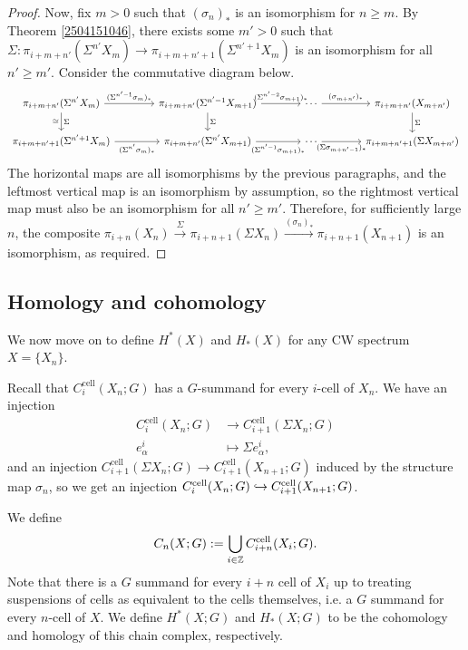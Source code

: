 \documentclass[11pt, titlepage]{article} %
\def\inj{\ensuremath\hookrightarrow}
\def\inte{\ensuremath\mathbb{Z}}
\numberwithin{equation}{subsection}
\theoremstyle{plain}
\theoremstyle{definition}
\begin{document}
\begin{proof}
Now, fix \(m >0\) such that \((\sigma_n)_*\) is an isomorphism for \(n\geq m\). By Theorem \ref{2504151046}, there exists some \(m'> 0\) such that \(\Sigma : \pi_{i+m+n'}(\Sigma^{n'}X_m)\to \pi_{i+m+n'+1}(\Sigma^{n'+1}X_m)\) is an isomorphism for all \(n'\geq m'\). Consider the  commutative diagram below. %
\[\begin{tikzcd}[column sep=9ex]
 \pi_{i+m+n'}(\Sigma^{n'}X_m) \arrow[r, "(\Sigma^{n'-1}\sigma_m)_*"] \arrow{d}{\Sigma}[swap]{\cong}  & \pi_{i+m+n'}(\Sigma^{n'-1}X_{m+1}) \arrow[r, "(\Sigma^{n'-2}\sigma_{m+1})_*"] \arrow[d, "\Sigma"] & \cdots \arrow[r, "(\sigma_{m+n'})_*"] & \pi_{i+m+n'}(X_{m+n'}) \arrow[d, "\Sigma"]\\
 \pi_{i+m+n'+1}(\Sigma^{n'+1}X_m) \arrow[r, swap, "(\Sigma^{n'}\sigma_m)_*"]  & \pi_{i+m+n'}(\Sigma^{n'}X_{m+1}) \arrow[r, "(\Sigma^{n'-1}\sigma_{m+1})_*"'] & \cdots \arrow[r, "(\Sigma \sigma_{m+n'-1})_*"'] & \pi_{i+m+n'+1}(\Sigma X_{m+n'}) 
 \end{tikzcd}\]
The horizontal maps are all isomorphisms by the previous paragraphs, and the leftmost vertical map is an isomorphism by assumption, so the rightmost vertical map must also be an isomorphism for all \(n' \geq m'\). Therefore, for sufficiently large \(n\), the composite \(\pi_{i+n}(X_n) \xrightarrow{\Sigma}\pi_{i+n+1}(\Sigma X_{n})\xrightarrow{(\sigma_n)_*}\pi_{i+n+1}(X_{n+1})\) is an isomorphism, as required. 
\end{proof}

\subsection{Homology and cohomology}

We now move on to define \(H^*(X)\) and \(H_*(X)\) for any CW spectrum \(X=\{X_n\}\).

Recall that \(C^\text{cell}_i(X_n; G)\) has a \(G\)-summand for every \(i\)-cell of \(X_n\). We have an injection
\begin{align*}
C_i^\text{cell}(X_n;G) &\to C_{i+1}^\text{cell}(\Sigma X_n; G)\\
e^i_\alpha &\mapsto \Sigma e^i_\alpha,
\end{align*}
and an injection \(C^\text{cell}_{i+1}(\Sigma X_n; G)\to C^\text{cell}_{i+1}(X_{n+1}; G)\) induced by the structure map \(\sigma_n\), so we get an injection \(C^\text{cell}_i(X_n;G)\inj C^\text{cell}_{i+1}(X_{n+1};G)\).

We define
\[C_n(X ; G):=\bigcup_{i\in \inte}C^\text{cell}_{i+n}(X_i; G).\] 
Note that there is a \(G\) summand for every \(i+n\) cell of \(X_i\) up to treating suspensions of cells as equivalent to the cells themselves, i.e. a \(G\) summand for every \(n\)-cell of \(X\). We define \(H^*(X;G)\) and \(H_*(X;G)\) to be the cohomology and homology of this chain complex, respectively.
\end{document}
